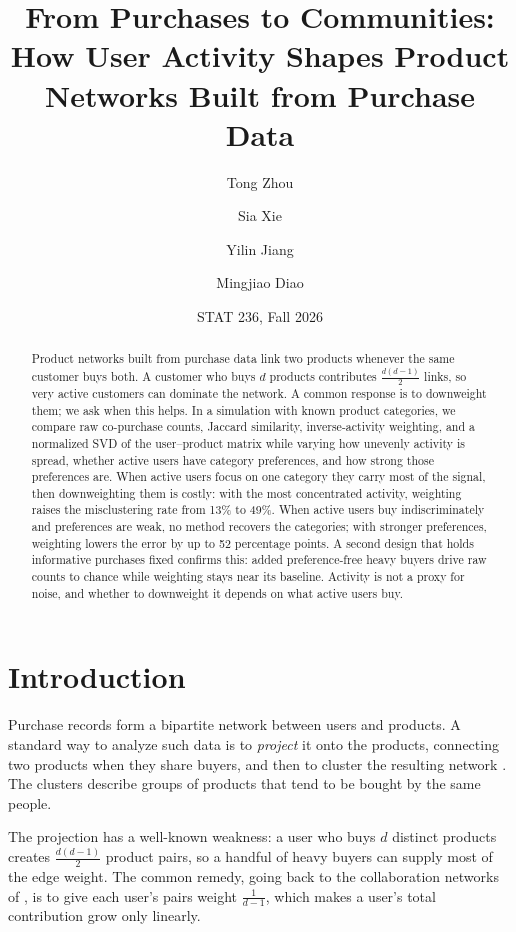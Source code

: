 \documentclass[12pt]{article}
\title{\vspace{-1.6em}From Purchases to Communities:\\[2pt]
\large How User Activity Shapes Product Networks Built from Purchase Data}
\author{Tong Zhou \and Sia Xie \and Yilin Jiang \and Mingjiao Diao}
\date{STAT 236, Fall 2026}
\begin{document}
\maketitle
\vspace{-1.2em}

\begin{abstract}
\noindent
Product networks built from purchase data link two products whenever the same customer buys both. A customer who buys $d$ products contributes $\frac{d(d-1)}{2}$ links, so very active customers can dominate the network. A common response is to downweight them; we ask when this helps. In a simulation with known product categories, we compare raw co-purchase counts, Jaccard similarity, inverse-activity weighting, and a normalized SVD of the user--product matrix while varying how unevenly activity is spread, whether active users have category preferences, and how strong those preferences are. When active users focus on one category they carry most of the signal, then downweighting them is costly: with the most concentrated activity, weighting raises the misclustering rate from 13\% to 49\%. When active users buy indiscriminately and preferences are weak, no method recovers the categories; with stronger preferences, weighting lowers the error by up to 52 percentage points. A second design that holds informative purchases fixed confirms this: added preference-free heavy buyers drive raw counts to chance while weighting stays near its baseline. Activity is not a proxy for noise, and whether to downweight it depends on what active users buy.
\end{abstract}

\section{Introduction}

Purchase records form a bipartite network between users and products. A standard way to analyze such data is to \emph{project} it onto the products, connecting two products when they share buyers, and then to cluster the resulting network \citep{vonluxburg2007,ke2026}. The clusters describe groups of products that tend to be bought by the same people.

The projection has a well-known weakness: a user who buys $d$ distinct products creates $\frac{d(d-1)}{2}$ product pairs, so a handful of heavy buyers can supply most of the edge weight. The common remedy, going back to the collaboration networks of \citet{newman2001}, is to give each user's pairs weight $\frac{1}{d-1}$, which makes a user's total contribution grow only linearly.
\end{document}
